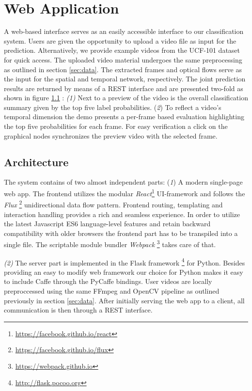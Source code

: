 \section{Web Application}
\label{sec:web}

A web-based interface serves as an easily accessible interface to our classification system.
Users are given the opportunity to upload a video file as input for the prediction.
Alternatively, we provide example videos from the UCF-101 dataset for quick access.
The uploaded video material undergoes the same preprocessing as outlined in section \ref{sec:data}.
The extracted frames and optical flows serve as the input for the spatial and temporal network, respectively.
The joint prediction results are returned by means of a REST interface and are presented two-fold as shown in figure \ref{} :
\textit{(1)} Next to a preview of the video is the overall classification summary given by the top five label probabilities.
(\textit{2}) To reflect a video’s temporal dimension the demo presents a per-frame based evaluation highlighting the top five probabilities for each frame.
For easy verification a click on the graphical nodes synchronizes the preview video with the selected frame.

\subsection{Architecture}
The system contains of two almost independent parts:
(\textit{1}) A modern single-page web app.
The frontend utilizes the modular \textit{React}\footnote{\url{https://facebook.github.io/react}} UI-framework and follows the \textit{Flux} \footnote{\url{https://facebook.github.io/flux}} unidirectional data flow pattern.
Frontend routing, templating and interaction handling provides a rich and seamless experience.
In order to utilize the latest Javascript ES6 language-level features and retain backward compatibility with older browsers the frontend part has to be transpiled into a single file.
The scriptable module bundler \textit{Webpack} \footnote{\url{https://webpack.github.io}} takes care of that.

\textit{(2)} The server part is implemented in the Flask framework \footnote{\url{http://flask.pocoo.org}} for Python.
Besides providing an easy to modify web framework our choice for Python makes it easy to include Caffe through the PyCaffe bindings.
User videos are locally preproccessed using the same FFmpeg and OpenCV pipeline as outlined previously in section \ref{sec:data}.
After initially serving the web app to a client, all communication is then through a REST interface.

